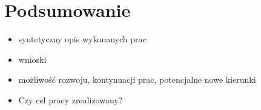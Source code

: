 \documentclass[a4paper,twoside,12pt]{book}
\begin{document}

\chapter{Podsumowanie}


\begin{itemize}
\item syntetyczny opis wykonanych prac
\item wnioski
\item możliwość rozwoju, kontynuacji prac, potencjalne nowe kierunki
\item Czy cel pracy zrealizowany? 
\end{itemize}



\backmatter

\cleardoublepage
{}
\printbibliography           %
\end{document}
